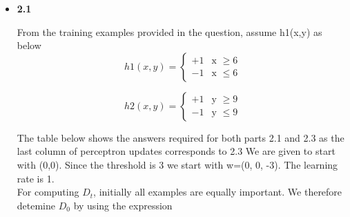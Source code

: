 \documentclass[11pt]{article}
\begin{document}
\begin{itemize}

\item[]
\textbf{2.1}

From the training examples provided in the question,
assume h1(x,y) as below\\
\begin{equation*}
h1(x,y) = \begin{cases}
+1 &\text{x $\ge 6$}\\
-1 &\text{x $\leq 6$}
\end{cases}
\end{equation*}

\begin{equation*}
h2(x,y) = \begin{cases}
+1 &\text{y $\ge 9$}\\
-1 &\text{y $\leq 9$}
\end{cases}
\end{equation*}


The table below shows the answers required for both parts 2.1 and 2.3 as the last column of perceptron updates corresponds to 2.3
We are given to start with (0,0). Since the threshold is 3 we start with w=(0, 0, -3). The learning rate is 1. \\

For computing $D_t$, initially all examples are equally important. We therefore detemine $D_0$ by using the expression




\end{itemize}
\end{document}
